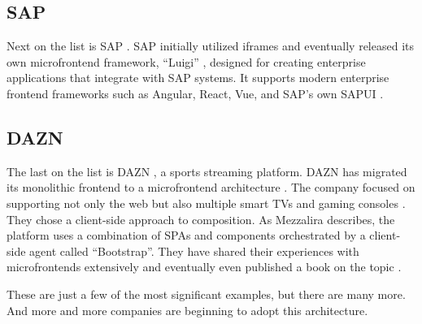 \subsection*{SAP}
Next on the list is SAP \cite{SAP}. SAP initially utilized iframes and eventually released its own microfrontend framework, ``Luigi'' \cite{Luigi}, designed for creating enterprise applications that integrate with SAP systems. It supports modern enterprise frontend frameworks such as Angular, React, Vue, and SAP's own SAPUI \cite{MezzaliraBuildingMf}.

\subsection*{DAZN}
The last on the list is DAZN \cite{DAZN}, a sports streaming platform. DAZN has migrated its monolithic frontend to a microfrontend architecture \cite{Geers}. The company focused on supporting not only the web but also multiple smart TVs and gaming consoles \cite{MezzaliraBuildingMf}. They chose a client-side approach to composition. As Mezzalira \cite{MezzaliraBuildingMf} describes, the platform uses a combination of SPAs and components orchestrated by a client-side agent called ``Bootstrap''. They have shared their experiences with microfrontends extensively and eventually even published a book on the topic \cite{MezzaliraBuildingMf}.

\noindent
These are just a few of the most significant examples, but there are many more. And more and more companies are beginning to adopt this architecture.